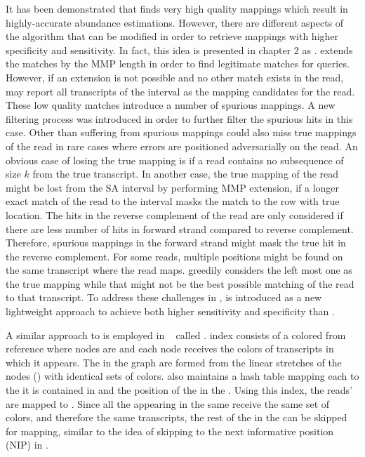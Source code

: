 It has been demonstrated that \qm finds very high quality mappings which result 
in highly-accurate abundance estimations. However, there are different aspects of 
the algorithm that can be modified in order to retrieve mappings with higher 
specificity and sensitivity. In fact, this idea is presented in chapter 2 as 
\sla. \Qm extends the \kmer matches by the MMP length in order to find legitimate 
matches for queries. However, if an extension is not possible and no other \kmer 
match exists in the read, \qm may report all transcripts of the interval as the 
mapping candidates for the read. These low quality matches introduce a number 
of spurious mappings. A new filtering process was introduced in order to further filter 
the spurious hits in this case. Other than suffering from spurious mappings \qm 
could also miss true mappings of the read in rare cases where errors are 
positioned adversarially on the read. An obvious case of losing the true mapping 
is if a read contains no subsequence of size $k$ from the true transcript. In 
another case, the true mapping of the read might be lost from the SA interval 
by performing MMP extension, if a longer exact match of the read to the interval 
masks the match to the row with true location. The hits in the reverse complement 
of the read are only considered if there are less number of hits in forward strand 
compared to reverse complement. Therefore, spurious mappings in the forward strand 
might mask the true hit in the reverse complement. For some reads, multiple 
positions might be found on the same transcript where the read maps. \Qm 
greedily considers the left most one as the true mapping while that might 
not be the best possible matching of the read to that transcript. To address 
these challenges in \qm, \sla is introduced as a new lightweight approach to 
achieve both higher sensitivity and specificity than \qm.

A similar approach to \qm is employed in \kallisto~\citep{Bray2016Kallisto} 
called \pa. \Kallisto index consists of a colored \dbg from reference 
where nodes are \kmers and each node receives the colors of transcripts in which 
it appears. The \unitigs in the graph are formed from the linear stretches of the 
nodes (\kmers) with identical sets of colors. \Kallisto also maintains a hash 
table mapping each \kmer to the \unitig it is contained in and the position of the \kmer 
in the \unitig. Using this index, the reads' \kmers are mapped to \unitigs. Since 
all the \kmers appearing in the same \unitig receive the same set of colors, and 
therefore the same transcripts, the rest of the \kmers in the \unitig can be 
skipped for mapping, similar to the idea of skipping to 
the next informative position (NIP) in \qm.

